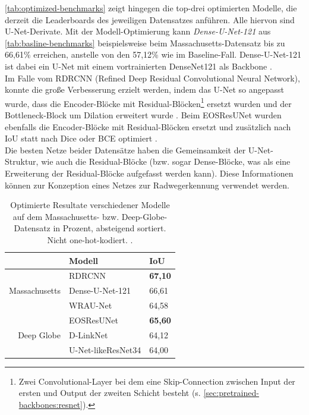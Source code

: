 \autoref{tab:optimized-benchmarks} zeigt hingegen die top-drei optimierten Modelle, die derzeit die Leaderboards 
des jeweiligen Datensatzes anführen. Alle hiervon sind U-Net-Derivate.
Mit der Modell-Optimierung kann \textit{Dense-U-Net-121} aus \autoref{tab:basline-benchmarks} beispielsweise beim Massachusetts-Datensatz 
bis zu 66,61\% erreichen, anstelle von den 57,12\% wie im Baseline-Fall. 
Dense-U-Net-121 ist dabei ein U-Net mit einem vortrainierten DenseNet121 als Backbone \cite{C.Henry.2021}. \\
Im Falle vom RDRCNN (Refined Deep Residual Convolutional Neural Network), konnte die große Verbesserung erzielt werden,
indem das U-Net so angepasst wurde, dass die Encoder-Blöcke mit Residual-Blöcken\footnote{Zwei Convolutional-Layer bei dem eine Skip-Connection zwischen Input der ersten und Output der zweiten Schicht besteht (s. \autoref{sec:pretrained-backbones:resnet}).} 
ersetzt wurden und der Bottleneck-Block
um Dilation erweitert wurde \cite{Gao.2019}. 
Beim EOSResUNet wurden ebenfalls die Encoder-Blöcke mit Residual-Blöcken ersetzt und zusätzlich nach \ac{IoU} statt nach Dice oder \ac{BCE} optimiert \cite{O.Filin.2018}. \\
Die besten Netze beider Datensätze haben die Gemeinsamkeit der U-Net-Struktur, wie auch die Residual-Blöcke (bzw.
sogar Dense-Blöcke, was als eine Erweiterung der Residual-Blöcke aufgefasst werden kann). 
Diese Informationen können zur Konzeption eines Netzes zur Radwegerkennung verwendet werden.  

\newcommand*\rot{\rotatebox{60}}

\begin{table}
	\centering
	\begin{tabular}{r|l|l}
		& Modell & IoU \\
		\midrule
		& RDRCNN & \textbf{67,10} \\
		Massachusetts & Dense-U-Net-121 & 66,61  \\
		& WRAU-Net & 64,58 \\
		\midrule
		& EOSResUNet & \textbf{65,60} \\
		Deep Globe & D-LinkNet & 64,12 \\
		& U-Net-likeResNet34 & 64,00 \\
	\end{tabular}
	\caption{Optimierte Resultate verschiedener Modelle auf dem Massachusetts- 
	bzw. Deep-Globe-Datensatz in Prozent, absteigend sortiert. Nicht one-hot-kodiert. \cite{C.Henry.2021}.}
	\label{tab:optimized-benchmarks}
\end{table}